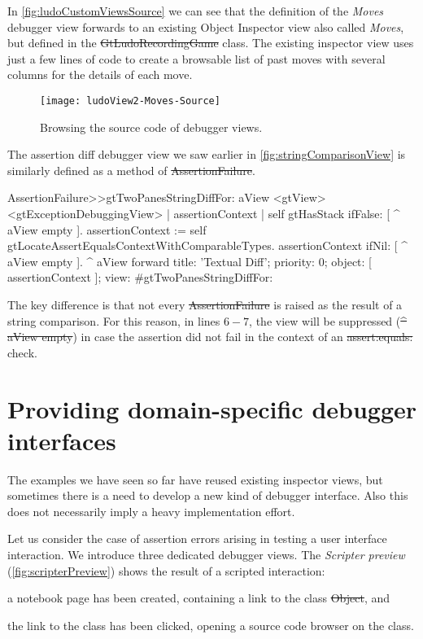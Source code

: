 \documentclass[sigplan,anonymous,review,10pt]{acmart}
\begin{document}
In \autoref{fig:ludoCustomViewsSource} we can see that the definition of the \emph{Moves} debugger view forwards to an existing Object Inspector view also called \emph{Moves}, but defined in the \st{GtLudoRecordingGame} class.
The existing inspector view uses just a few lines of code to create a browsable list of past moves with several columns for the details of each move.

\begin{figure}[h]
  \texttt{[image: ludoView2-Moves-Source]}
  \caption{Browsing the source code of debugger views.}
  \label{fig:ludoCustomViewsSource}
\end{figure}

The assertion diff debugger view we saw earlier in \autoref{fig:stringComparisonView} is similarly defined as a method of \st{AssertionFailure}.
\begin{code}
AssertionFailure>>gtTwoPanesStringDiffFor: aView
	<gtView>
	<gtExceptionDebuggingView>
	| assertionContext |
	self gtHasStack ifFalse: [ ^ aView empty ].
	assertionContext := self gtLocateAssertEqualsContextWithComparableTypes.
	assertionContext ifNil: [ ^ aView empty ].
	^ aView forward
		title: 'Textual Diff';
		priority: 0;
		object: [ assertionContext ];
		view: #gtTwoPanesStringDiffFor:
\end{code}
The key difference is that not every \st{AssertionFailure} is raised as the result of a string comparison.
For this reason, in lines $6-7$, the view will be suppressed (\st{^ aView empty}) in case the assertion did not fail in the context of an \st{assert:equals:} check.

\section{Providing domain-specific debugger interfaces}\label{sec:interactions}

The examples we have seen so far have reused existing inspector views, but sometimes there is a need to develop a new kind of debugger interface.
Also this does not necessarily imply a heavy implementation effort.


Let us consider the case of assertion errors arising in testing a user interface interaction.
We introduce three dedicated debugger views.
The \emph{Scripter preview} (\autoref{fig:scripterPreview}) shows the result of a scripted interaction:
\begin{inparaenum}[(i)]
	\item a notebook page has been created, containing a link to the class \st{Object}, and
	\item the link to the class has been clicked, opening a source code browser on the class.
\end{inparaenum}
\end{document}
